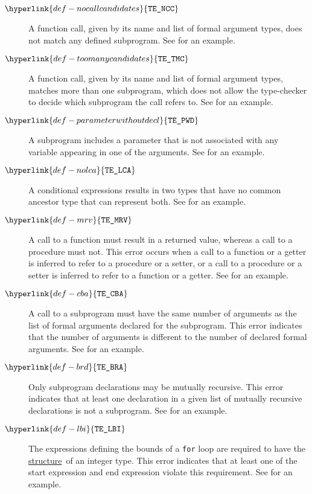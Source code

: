 \documentclass{book}
\newcommand\structure[0]{\hyperlink{def-structure}{structure}}
\newcommand\TypeErrorCode[1]{\texttt{TE\_#1}}
\newcommand\NoCallCandidates[0]{\hyperlink{def-nocallcandidates}{\TypeErrorCode{NCC}}}
\newcommand\TooManyCandidates[0]{\hyperlink{def-toomanycandidates}{\TypeErrorCode{TMC}}}
\newcommand\ParameterWithoutDecl[0]{\hyperlink{def-parameterwithoutdecl}{\TypeErrorCode{PWD}}}
\newcommand\NoLCA[0]{\hyperlink{def-nolca}{\TypeErrorCode{LCA}}}
\newcommand\MismatchedReturnValue[0]{\hyperlink{def-mrv}{\TypeErrorCode{MRV}}}
\newcommand\CallBadArity[0]{\hyperlink{def-cba}{\TypeErrorCode{CBA}}}
\newcommand\BadRecursiveDecls[0]{\hyperlink{def-brd}{\TypeErrorCode{BRA}}}
\newcommand\RequireIntegerForLoopBounds[0]{\hyperlink{def-lbi}{\TypeErrorCode{LBI}}}
\begin{document}
\begin{description}
\hypertarget{def-nocallcandidates}{}
\item[$\NoCallCandidates$]
A function call, given by its name and list of formal argument types, does not match any defined subprogram.
See  for an example.

\hypertarget{def-toomanycandidates}{}
\item[$\TooManyCandidates$]
A function call, given by its name and list of formal argument types, matches more than one subprogram,
which does not allow the type-checker to decide which subprogram the call refers to.
See  for an example.

\hypertarget{def-parameterwithoutdecl}{}
\item[$\ParameterWithoutDecl$]
A subprogram includes a parameter that is not associated with any variable appearing in one of the arguments.
See  for an example.

\hypertarget{def-nolca}{}
\item[$\NoLCA$]
A conditional expressions results in two types that have no common ancestor type that can represent both.
See  for an example.

\hypertarget{def-mrv}{}
\item[$\MismatchedReturnValue$]
A call to a function must result in a returned value,
whereas a call to a procedure must not.
This error occurs when a call to a function or a getter is inferred to refer to a procedure or a setter,
or a call to a procedure or a setter is inferred to refer to a function or a getter.
See  for an example.

\hypertarget{def-cba}{}
\item[$\CallBadArity$]
A call to a subprogram must have the same number of arguments as the list of formal arguments
declared for the subprogram.
This error indicates that the number of arguments is different to the number of declared formal arguments.
See  for an example.

\hypertarget{def-brd}{}
\item[$\BadRecursiveDecls$]
Only subprogram declarations may be mutually recursive.
This error indicates that at least one declaration in a given list of mutually recursive declarations
is not a subprogram.
See  for an example.

\hypertarget{def-lbi}{}
\item[$\RequireIntegerForLoopBounds$]
The expressions defining the bounds of a \texttt{for} loop are required to have the \structure\ of
an integer type.
This error indicates that at least one of the start expression and end expression violate this
requirement.
See  for an example.


\end{description}
\end{document}
